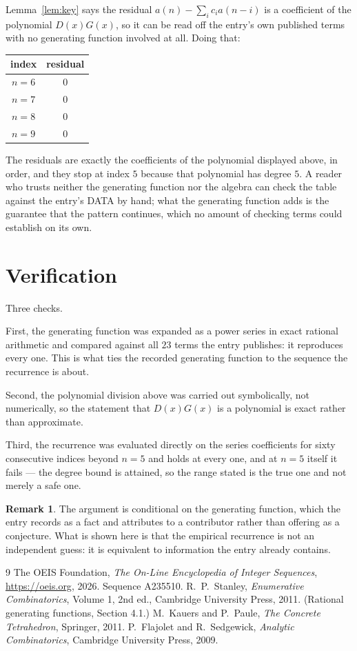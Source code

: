 \documentclass[11pt,a4paper]{article}
\theoremstyle{plain}
\theoremstyle{definition}
\newtheorem{remark}[theorem]{Remark}
\begin{document}
Lemma~\ref{lem:key} says the residual $a(n)-\sum_ic_ia(n-i)$ is a coefficient of the
polynomial $D(x)G(x)$, so it can be read off the entry's own published terms with no
generating function involved at all. Doing that:
\begin{center}
\begin{tabular}{cc}
index & residual \\ \hline
$n=6$ & $0$ \\
$n=7$ & $0$ \\
$n=8$ & $0$ \\
$n=9$ & $0$
\end{tabular}
\end{center}
The residuals are exactly the coefficients of the polynomial displayed above, in order, and
they stop at index $5$ because that polynomial has degree $5$. A reader who trusts
neither the generating function nor the algebra can check the table against the entry's DATA
by hand; what the generating function adds is the guarantee that the pattern continues, which
no amount of checking terms could establish on its own.

\section{Verification}

Three checks.

First, the generating function was expanded as a power series in exact rational arithmetic and
compared against all $23$ terms the entry publishes: it reproduces every one. This is
what ties the recorded generating function to the sequence the recurrence is about.

Second, the polynomial division above was carried out symbolically, not numerically, so the
statement that $D(x)G(x)$ is a polynomial is exact rather than approximate.

Third, the recurrence was evaluated directly on the series coefficients for sixty consecutive
indices beyond $n=5$ and holds at every one, and at $n=5$ itself it fails --- the
degree bound is attained, so the range stated is the true one and not merely a safe one.

\begin{remark}
The argument is conditional on the generating function, which the entry records as a fact and
attributes to a contributor rather than offering as a conjecture. What is shown here is that
the empirical recurrence is not an independent guess: it is equivalent to information the
entry already contains.
\end{remark}

\begin{thebibliography}{9}
 The OEIS Foundation, \emph{The On-Line Encyclopedia of Integer
Sequences}, \url{https://oeis.org}, 2026. Sequence A235510.
 R.~P.~Stanley, \emph{Enumerative Combinatorics}, Volume 1, 2nd ed.,
Cambridge University Press, 2011. (Rational generating functions, Section 4.1.)
 M.~Kauers and P.~Paule, \emph{The Concrete Tetrahedron}, Springer, 2011.
 P.~Flajolet and R.~Sedgewick, \emph{Analytic Combinatorics}, Cambridge
University Press, 2009.
\end{thebibliography}
\end{document}
